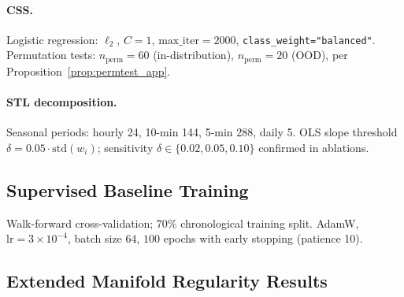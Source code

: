 \documentclass[10pt]{article}
\theoremstyle{definition}
\theoremstyle{remark}
\begin{document}
\paragraph{CSS.}
Logistic regression: $\ell_2$, $C=1$, $\text{max\_iter}=2000$,
\texttt{class\_weight="balanced"}.
Permutation tests: $n_{\mathrm{perm}}=60$ (in-distribution),
$n_{\mathrm{perm}}=20$ (OOD), per Proposition~\ref{prop:permtest_app}.

\paragraph{STL decomposition.}
Seasonal periods: hourly 24, 10-min 144, 5-min 288, daily 5.
OLS slope threshold $\delta=0.05\cdot\text{std}(w_i)$;
sensitivity $\delta\in\{0.02,0.05,0.10\}$ confirmed in ablations.

\subsection{Supervised Baseline Training}

Walk-forward cross-validation; 70\% chronological training split.
AdamW, $\text{lr}=3\times10^{-4}$, batch size $64$, $100$ epochs with early
stopping (patience 10).

\subsection{Extended Manifold Regularity Results}
\end{document}
